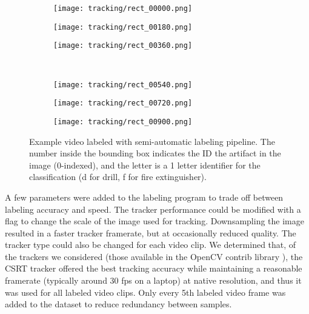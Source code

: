 \begin{figure}
	\centering
	\begin{subfigure}{0.32\textwidth}
		\texttt{[image: tracking/rect\_00000.png]}
	\end{subfigure}		
	\hfill
	\begin{subfigure}{0.32\textwidth}
		\texttt{[image: tracking/rect\_00180.png]}
	\end{subfigure}
	\hfill
	\begin{subfigure}{0.32\textwidth}
		\texttt{[image: tracking/rect\_00360.png]}
	\end{subfigure}
	\\
	\begin{subfigure}{0.32\textwidth}
		\texttt{[image: tracking/rect\_00540.png]}
	\end{subfigure}		
	\hfill
	\begin{subfigure}{0.32\textwidth}
		\texttt{[image: tracking/rect\_00720.png]}
	\end{subfigure}
	\hfill
	\begin{subfigure}{0.32\textwidth}
		\texttt{[image: tracking/rect\_00900.png]}
	\end{subfigure}	
	\caption[Example video labeled with semi-automatic pipeline]{Example video labeled with semi-automatic labeling pipeline. The number inside the bounding box indicates the ID the artifact in the image (0-indexed), and the letter is a 1 letter identifier for the classification (d for drill, f for fire extinguisher).}
	\label{semi_automatic_labeling}
\end{figure}

A few parameters were added to the labeling program to trade off between labeling accuracy and speed. The tracker performance could be modified with a flag to change the scale of the image used for tracking. Downsampling the image resulted in a faster tracker framerate, but at occasionally reduced quality. The tracker type could also be changed for each video clip. We determined that, of the trackers we considered (those available in the OpenCV contrib library \cite{opencvcontrib}), the CSRT tracker \cite{lukezic2017discriminative} offered the best tracking accuracy while maintaining a reasonable framerate (typically around 30 fps on a laptop) at native resolution, and thus it was used for all labeled video clips. Only every 5th labeled video frame was added to the dataset to reduce redundancy between samples.

